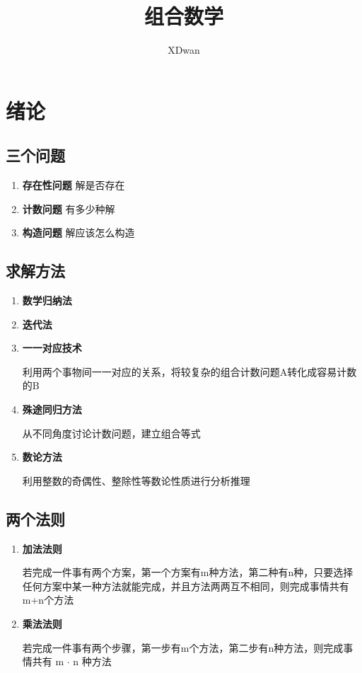 \documentclass{article}
\title{组合数学}
\author{XDwan}
\begin{document}
    
\renewcommand{\contentsname}{目录}%
\tableofcontents
\newpage

\section{绪论}

\subsection{三个问题}

\begin{enumerate}
    \item \textbf{存在性问题} 解是否存在
    \item \textbf{计数问题} 有多少种解
    \item \textbf{构造问题} 解应该怎么构造
\end{enumerate}

\subsection{求解方法}

\begin{enumerate}
    \item \textbf{数学归纳法}
    \item \textbf{迭代法}
    \item \textbf{一一对应技术} 
    
    利用两个事物间一一对应的关系，将较复杂的组合计数问题A转化成容易计数的B

    \item \textbf{殊途同归方法} 
    
    从不同角度讨论计数问题，建立组合等式

    \item \textbf{数论方法} 
    
    利用整数的奇偶性、整除性等数论性质进行分析推理


\end{enumerate}

\subsection{两个法则}

\begin{enumerate}
    \item \textbf{加法法则} 
    
    若完成一件事有两个方案，第一个方案有m种方法，第二种有n种，只要选择任何方案中某一种方法就能完成，并且方法两两互不相同，则完成事情共有m+n个方法
    
    \item \textbf{乘法法则} 
    
    若完成一件事有两个步骤，第一步有m个方法，第二步有n种方法，则完成事情共有 m $\cdot$ n 种方法

\end{enumerate}
\end{document}
